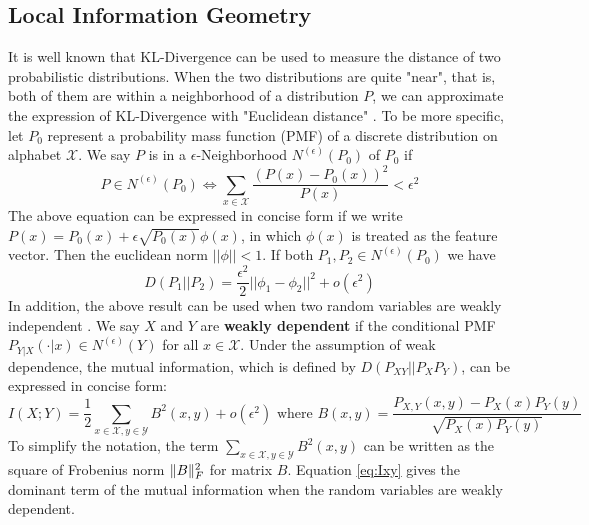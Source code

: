 \subsection{Local Information Geometry}\label{subsec:lig}
It is well known that KL-Divergence can be used to measure the distance of two probabilistic distributions. When the two distributions are quite "near", that is, both of them are within a neighborhood of a distribution $P$, we can approximate the expression of KL-Divergence with "Euclidean distance" \citep{huang2017information}. To be more specific, let $P_0$ represent a probability mass function (PMF) of a discrete distribution on alphabet $\mathcal{X}$. We say $P$ is in a $\epsilon$-Neighborhood $N^{(\epsilon)}(P_0)$ of $P_0$ if
\begin{equation}
P \in N^{(\epsilon)}(P_0) \iff \sum_{x \in \mathcal{X}} \frac{(P(x) - P_0(x))^2}{P(x)} < \epsilon^2
\end{equation}
The above equation can be expressed in concise form if we write $P(x) = P_0(x) + \epsilon
\sqrt{P_0(x)} \phi(x)$, in which $\phi(x)$ is treated as the feature vector. Then the euclidean norm $||\phi || < 1$.
If both $P_1, P_2 \in N^{(\epsilon)}(P_0)$ we have
\begin{equation}\label{eq:approx:ig}
D(P_1 || P_2) = \frac{\epsilon^2}{2} ||\phi_1 - \phi_2||^2 + o(\epsilon^2)
\end{equation}
In addition, the above result can be used when two random variables are weakly independent \citep{huang2019universal}. We say $X$ and $Y$ are \textbf{weakly dependent} if the conditional PMF $P_{Y|X}(\cdot |x) \in N^{(\epsilon)}(Y)$ for all $x \in \mathcal{X}$. Under the assumption of
weak dependence, the mutual information, which is defined by $D(P_{XY}||P_XP_Y)$, can be expressed
in concise form:
\begin{equation}\label{eq:Ixy}
I(X;Y) = \frac{1}{2}\sum_{x\in \mathcal{X}, y\in \mathcal{Y}} B^2(x,y) + o(\epsilon^2) \textrm{ where }  B(x,y)=\frac{P_{X,Y}(x,y) - P_X(x) P_Y(y)}{\sqrt{P_X(x)P_Y(y)}}
\end{equation}
To simplify the notation, the term $\sum_{x\in \mathcal{X}, y\in \mathcal{Y}} B^2(x,y)$ can be written as the square of Frobenius norm $\lVert B\rVert_F^2$ for matrix $B$. Equation \eqref{eq:Ixy} gives the dominant term
of the mutual information when the random variables are weakly dependent.

